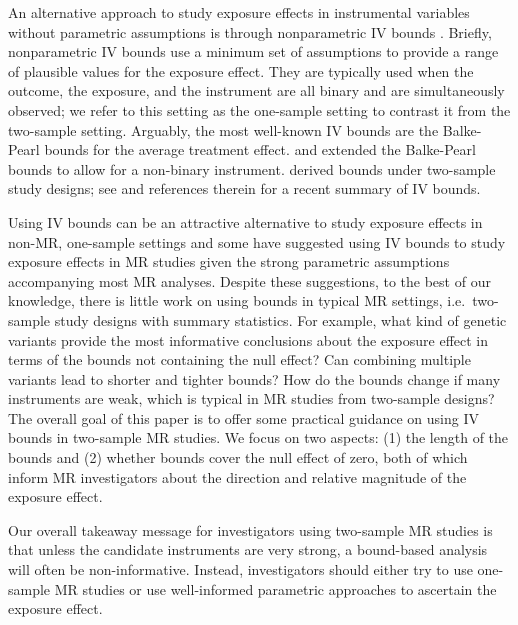 \documentclass[
]{article}
\theoremstyle{plain}
\begin{document}
An alternative approach to study exposure effects in instrumental variables without parametric assumptions is through nonparametric IV bounds \autocite{balke_bounds_1997,cheng_bounds_2006,manski_nonparametric_1990,richardson_ace_2014,robins_analysis_1989}. Briefly, nonparametric IV bounds use a minimum set of assumptions to provide a range of plausible values for the exposure effect. They are typically used when the outcome, the exposure, and the instrument are all binary and are simultaneously observed; we refer to this setting as the one-sample setting to contrast it from the two-sample setting. Arguably, the most well-known IV bounds are the Balke-Pearl bounds \autocite{balke_bounds_1997} for the average treatment effect. \textcite{cheng_bounds_2006} and \textcite{richardson_ace_2014} extended the Balke-Pearl bounds to allow for a non-binary instrument. \textcite{ramsahai_causal_2012} derived bounds under two-sample study designs; see \textcite{swanson_partial_2018} and references therein for a recent summary of IV bounds.

Using IV bounds can be an attractive alternative to study exposure effects in non-MR, one-sample settings \autocite{swanson_commentary_2013,swanson_partial_2018} and some \autocite{didelez_mendelian_2007,swanson_commentary_2017} have suggested using IV bounds to study exposure effects in MR studies given the strong parametric assumptions accompanying most MR analyses. Despite these suggestions, to the best of our knowledge, there is little work on using bounds in typical MR settings, i.e.~two-sample study designs with summary statistics. For example, what kind of genetic variants provide the most informative conclusions about the exposure effect in terms of the bounds not containing the null effect? Can combining multiple variants lead to shorter and tighter bounds? How do the bounds change if many instruments are weak, which is typical in MR studies from two-sample designs? The overall goal of this paper is to offer some practical guidance on using IV bounds in two-sample MR studies. We focus on two aspects: (1) the length of the bounds and (2) whether bounds cover the null effect of zero, both of which inform MR investigators about the direction and relative magnitude of the exposure effect.

Our overall takeaway message for investigators using two-sample MR studies is that unless the candidate instruments are very strong, a bound-based analysis will often be non-informative. Instead, investigators should either try to use one-sample MR studies or use well-informed parametric approaches to ascertain the exposure effect.
\end{document}
